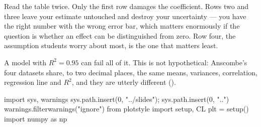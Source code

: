 \documentclass[
  letterpaper,
  10pt,
  twoside,
  openright,
  numbers=noenddot,
  chapterprefix=true]{scrbook}
\newenvironment{Shaded}{}{}
\newcommand{\DecValTok}[1]{\textcolor[rgb]{0.00,0.36,0.77}{#1}}
\newcommand{\ImportTok}[1]{\textcolor[rgb]{0.01,0.18,0.38}{#1}}
\newcommand{\NormalTok}[1]{\textcolor[rgb]{0.14,0.16,0.18}{#1}}
\newcommand{\OperatorTok}[1]{\textcolor[rgb]{0.14,0.16,0.18}{#1}}
\newcommand{\StringTok}[1]{\textcolor[rgb]{0.01,0.18,0.38}{#1}}
\begin{document}
Read the table twice. Only the first row damages the coefficient. Rows
two and three leave your estimate untouched and destroy your uncertainty
--- you have the right number with the wrong error bar, which matters
enormously if the question is whether an effect can be distinguished
from zero. Row four, the assumption students worry about most, is the
one that matters least.

A model with \(R^2 = 0.95\) can fail all of it. This is not
hypothetical: Anscombe's four datasets share, to two decimal places, the
same means, variances, correlation, regression line and \(R^2\), and
they are utterly different ().

\begin{Shaded}
\begin{Highlighting}[]
\ImportTok{import}\NormalTok{ sys, warnings}
\NormalTok{sys.path.insert(}\DecValTok{0}\NormalTok{, }\StringTok{"../slides"}\NormalTok{)}\OperatorTok{;}\NormalTok{ sys.path.insert(}\DecValTok{0}\NormalTok{, }\StringTok{".."}\NormalTok{)}
\NormalTok{warnings.filterwarnings(}\StringTok{"ignore"}\NormalTok{)}
\ImportTok{from}\NormalTok{ plotstyle }\ImportTok{import}\NormalTok{ setup, CL}
\NormalTok{plt }\OperatorTok{=}\NormalTok{ setup()}
\ImportTok{import}\NormalTok{ numpy }\ImportTok{as}\NormalTok{ np}


\end{Highlighting}
\end{Shaded}
\end{document}
